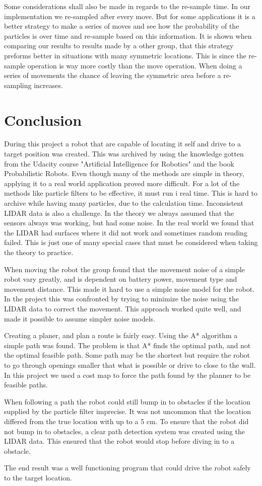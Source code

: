 Some considerations shall also be made in regards to the re-sample time. In our implementation we re-sampled after every move. But for some applications it is a better strategy to make a series of moves and see how the probability of the particles is over time and re-sample based on this information. It is shown when comparing our results to results made by a other group, that this strategy preforms better in situations with many symmetric locations. This is since the re-sample operation is way more costly than the move operation. When doing a series of movements the chance of leaving the symmetric area before a re-sampling increases. 


\chapter{Conclusion}
During this project a robot that are capable of locating it self and drive to a target position was created. This was archived by using the knowledge gotten from the Udacity course "Artificial Intelligence for Robotics"\cite{AIROK} and the book Probabilistic Robots. Even though many of the methods are simple in theory, applying it to a real world application proved more difficult. For a lot of the methods like particle filters to be effective, it must run i real time. This is hard to archive while having many particles, due to the calculation time. Inconsistent LIDAR data is also a challenge. In the theory we always assumed that the sensors always was working, but had some noise. In the real world we found that the LIDAR had surfaces where it did not work and sometimes random reading failed. This is just one of many special cases that must be considered when taking the theory to practice.  

When moving the robot the group found that the movement noise of a simple robot vary greatly, and is dependent on battery power, movement type and movement distance. This made it hard to use a simple noise model for the robot. In the project this was confronted by trying to minimize the noise using the LIDAR data to correct the movement. This approach worked quite well, and made it possible to assume simpler noise models.

Creating a planer, and plan a route is fairly easy. Using the A* algorithm a simple path was found. The problem is that A* finds the optimal path, and not the optimal feasible path. Some path may be the shortest but require the robot to go through openings smaller that what is possible or drive to close to the wall. In this project we used a cost map to force the path found by the planner to be feasible paths.

When following a path the robot could still bump in to obstacles if the location supplied by the particle filter imprecise. It was not uncommon that the location differed from the true location with up to a 5 cm. To ensure that the robot did not bump in to obstacles, a clear path detection system was created using the LIDAR data. This ensured that the robot would stop before diving in to a obstacle. 

The end result was a well functioning program that could drive the robot safely to the target location. 
